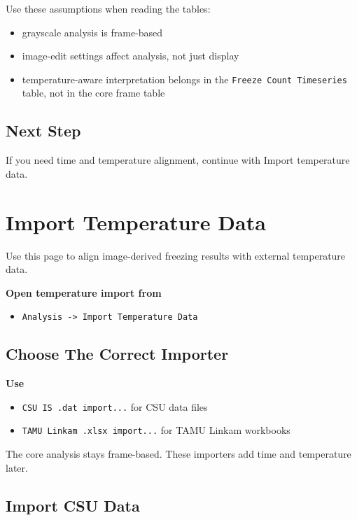 \documentclass[
  9pt,
  letterpaper,
  oneside,
  open=any,
  DIV=15,
  parskip=half-,
  headings=big,
  numbers=noenddot
]{scrbook}
\newcommand{\manuallead}[1]{%
  \vspace{0.15em}%
  {\sffamily\bfseries\color{ManualBlue}#1}\par\nobreak\vspace{0.05em}%
}
\begin{document}
Use these assumptions when reading the tables:


\begin{itemize}[leftmargin=*,itemsep=0.35em,topsep=0.4em]
\item grayscale analysis is frame-based
\item image-edit settings affect analysis, not just display
\item temperature-aware interpretation belongs in the \texttt{Freeze Count Timeseries} table, not in the core frame table
\end{itemize}

\section{Next Step}

If you need time and temperature alignment, continue with Import temperature data.


\chapter{Import Temperature Data}

Use this page to align image-derived freezing results with external temperature data.


\manuallead{Open temperature import from}

\begin{itemize}[leftmargin=*,itemsep=0.35em,topsep=0.4em]
\item \texttt{Analysis -> Import Temperature Data}
\end{itemize}

\section{Choose The Correct Importer}

\manuallead{Use}

\begin{itemize}[leftmargin=*,itemsep=0.35em,topsep=0.4em]
\item \texttt{CSU IS .dat import...} for CSU data files
\item \texttt{TAMU Linkam .xlsx import...} for TAMU Linkam workbooks
\end{itemize}

The core analysis stays frame-based. These importers add time and temperature later.


\section{Import CSU Data}
\end{document}
